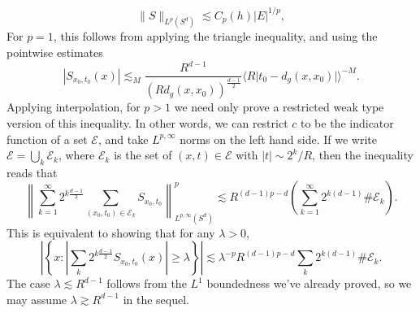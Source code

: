 \[ \| S \|_{L^p(S^d)} \lesssim C_p(h) |E|^{1/p}, \]
%
For $p = 1$, this follows from applying the triangle inequality, and using the pointwise estimates
%
\[ |{S\!}_{x_0,t_0}(x)| \lesssim_M \frac{R^{d-1}}{(R d_g(x,x_0))^{\frac{d-1}{2}}} \Big\langle R \big| t_0 - d_g(x,x_0) \big| \Big\rangle^{-M}. \]
%
Applying interpolation, for $p > 1$ we need only prove a restricted weak type version of this inequality. In other words, we can restrict $c$ to be the indicator function of a set $\mathcal{E}$, and take $L^{p,\infty}$ norms on the left hand side. If we write $\mathcal{E} = \bigcup_k \mathcal{E}_k$, where $\mathcal{E}_k$ is the set of $(x,t) \in \mathcal{E}$ with $|t| \sim 2^k / R$, then the inequality reads that
%
\[ \left\| \sum_{k = 1}^\infty 2^{k \frac{d-1}{2}} \sum_{(x_0,t_0) \in \mathcal{E}_k} {S\!}_{x_0,t_0} \right\|_{L^{p,\infty}(S^d)}^p \lesssim R^{(d-1)p - d} \left( \sum_{k = 1}^\infty 2^{k(d-1)} \# \mathcal{E}_k \right). \]%
%
%
%
%
%
%
%
%
This is equivalent to showing that for any $\lambda > 0$,
%
\[ \left| \left\{ x: \left|\sum_k 2^{k \frac{d-1}{2}} {S\!}_{x_0,t_0}(x)\right| \geq \lambda \right\} \right| \lesssim \lambda^{-p} R^{(d-1)p - d} \sum_k 2^{k(d-1)} \# \mathcal{E}_k. \]
%
The case $\lambda \lesssim R^{d-1}$ follows from the $L^1$ boundedness we've already proved, so we may assume $\lambda \gtrsim R^{d-1}$ in the sequel.

